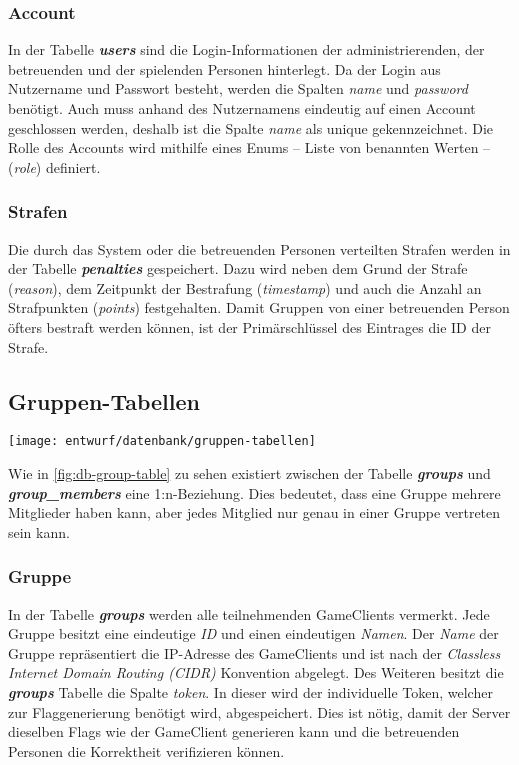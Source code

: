 \subsubsection{Account}
In der Tabelle \textbf{\textit{users}} sind die Login-Informationen der administrierenden, der betreuenden und der spielenden Personen hinterlegt. Da der Login aus Nutzername und Passwort besteht, werden die Spalten \textit{name} und \textit{password} benötigt. Auch muss anhand des Nutzernamens eindeutig auf einen Account geschlossen werden, deshalb ist die Spalte \textit{name} als unique gekennzeichnet. Die Rolle des Accounts wird mithilfe eines Enums -- Liste von benannten Werten -- (\textit{role}) definiert.

\subsubsection{Strafen}
Die durch das System oder die betreuenden Personen verteilten Strafen werden in der Tabelle \textbf{\textit{penalties}} gespeichert. Dazu wird neben dem Grund der Strafe (\textit{reason}), dem Zeitpunkt der Bestrafung (\textit{timestamp}) und auch die Anzahl an Strafpunkten (\textit{points}) festgehalten. Damit Gruppen von einer betreuenden Person öfters bestraft werden können, ist der Primärschlüssel des Eintrages die ID der Strafe.

\subsection{Gruppen-Tabellen}
\begin{center}
	\texttt{[image: entwurf/datenbank/gruppen-tabellen]}
	\label{fig:db-group-table}
\end{center}

Wie in \autoref{fig:db-group-table} zu sehen existiert zwischen der Tabelle \textbf{\textit{groups}} und \textbf{\textit{group\_members}} eine 1:n-Beziehung. Dies bedeutet, dass eine Gruppe mehrere Mitglieder haben kann, aber jedes Mitglied nur genau in einer Gruppe vertreten sein kann.

\subsubsection{Gruppe}
In der Tabelle \textbf{\textit{groups}} werden alle teilnehmenden GameClients vermerkt. Jede Gruppe besitzt eine eindeutige \textit{ID} und einen eindeutigen \textit{Namen}. Der \textit{Name} der Gruppe repräsentiert die IP-Adresse des GameClients und ist nach der \textit{Classless Internet Domain Routing (CIDR)} Konvention abgelegt. Des Weiteren besitzt die \textbf{\textit{groups}} Tabelle die Spalte \textit{token}. In dieser wird der individuelle Token, welcher zur Flaggenerierung benötigt wird, abgespeichert. Dies ist nötig, damit der Server dieselben Flags wie der GameClient generieren kann und die betreuenden Personen die Korrektheit verifizieren können.

